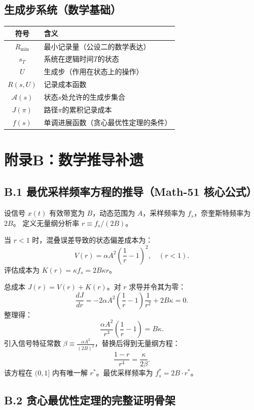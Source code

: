 \documentclass[11pt,a4paper]{article}
\begin{document}
\subsection{生成步系统（数学基础）}

\begin{center}
\begin{xltabular}{\textwidth}{c|X}
\toprule
\textbf{符号} & \textbf{含义} \\
\midrule
$R_{\min}$ & 最小记录量（公设二的数学表达） \\
$s_T$ & 系统在逻辑时间$T$的状态 \\
$U$ & 生成步（作用在状态上的操作） \\
$R(s,U)$ & 记录成本函数 \\
$\mathcal{A}(s)$ & 状态$s$处允许的生成步集合 \\
$J(\pi)$ & 路径$\pi$的累积记录成本 \\
$f(s)$ & 单调进展函数（贪心最优性定理的条件） \\
\bottomrule
\end{xltabular}
\end{center}

\section{附录B：数学推导补遗}

\subsection{B.1 最优采样频率方程的推导（Math-51 核心公式）}

设信号 $x(t)$ 有效带宽为 $B$，动态范围为 $A$，采样频率为 $f_s$，奈奎斯特频率为 $2B$。
定义无量纲分析率 $r \equiv f_s / (2B)$。

当 $r < 1$ 时，混叠误差导致的状态偏差成本为：
\[
V(r) = \alpha A^2 \left( \frac{1}{r} - 1 \right)^2, \quad (r < 1).
\]
评估成本为 $K(r) = \kappa f_s = 2B\kappa r$。

总成本 $J(r) = V(r) + K(r)$。对 $r$ 求导并令其为零：
\[
\frac{dJ}{dr} = -2\alpha A^2 \left( \frac{1}{r} - 1 \right) \frac{1}{r^2} + 2B\kappa = 0.
\]
整理得：
\[
\frac{\alpha A^2}{r^3} \left( \frac{1}{r} - 1 \right) = B\kappa.
\]
引入信号特征常数 $\beta \equiv \frac{\alpha A^2}{(2B)^2}$，替换后得到无量纲方程：
\[
\frac{1-r}{r^4} = \frac{\kappa}{2\beta}.
\]
该方程在 $(0,1]$ 内有唯一解 $r^*$。最优采样频率为 $f_s^* = 2B \cdot r^*$。

\subsection{B.2 贪心最优性定理的完整证明骨架}
\end{document}

